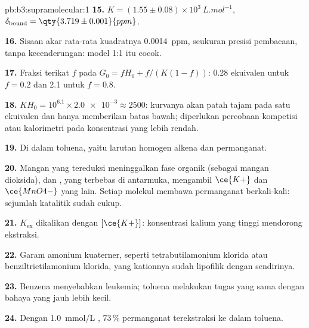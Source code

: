 \begin{solution}{pb:b3:supramolecular:1}
\textbf{15.} $K = (1.55 \pm 0.08) \times 10^3\ \unit{L.mol^{-1}}$, $\delta_{\mathrm{bound}} = \qty{3.719 \pm 0.001}{ppm}$.

\textbf{16.} Sisaan akar rata-rata kuadratnya \qty{0.0014}{ppm}, seukuran presisi
pembacaan, tanpa kecenderungan: model 1:1 itu cocok.

\textbf{17.} Fraksi terikat $f$ pada $G_0 = fH_0 + f/(K(1 - f))$: 0.28 ekuivalen untuk $f = 0.2$ dan 2.1 untuk $f = 0.8$.

\textbf{18.} $KH_0 = 10^{6.1} \times \num{2.0e-3} \approx 2500$: kurvanya akan patah tajam pada satu ekuivalen
dan hanya memberikan batas bawah; diperlukan percobaan kompetisi atau kalorimetri pada
konsentrasi yang lebih rendah.

\textbf{19.} Di dalam toluena, yaitu larutan homogen alkena dan permanganat.

\textbf{20.} Mangan yang tereduksi meninggalkan fase organik (sebagai mangan dioksida),
dan , yang terbebas di antarmuka, mengambil $\ce{K+}$ dan $\ce{MnO4-}$ yang lain. Setiap molekul
 membawa permanganat berkali-kali: sejumlah katalitik sudah cukup.

\textbf{21.} $K_{\mathrm{ex}}$ dikalikan dengan $[\ce{K+}]$: konsentrasi kalium yang tinggi mendorong ekstraksi.

\textbf{22.} Garam amonium kuaterner, seperti tetrabutilamonium klorida atau
benziltrietilamonium klorida, yang kationnya sudah lipofilik dengan sendirinya.

\textbf{23.} Benzena menyebabkan leukemia; toluena melakukan tugas yang sama dengan bahaya yang
jauh lebih kecil.

\textbf{24.} Dengan \qty{1.0}{mmol/L} , 73\,\% permanganat terekstraksi ke dalam
toluena.
\end{solution}
